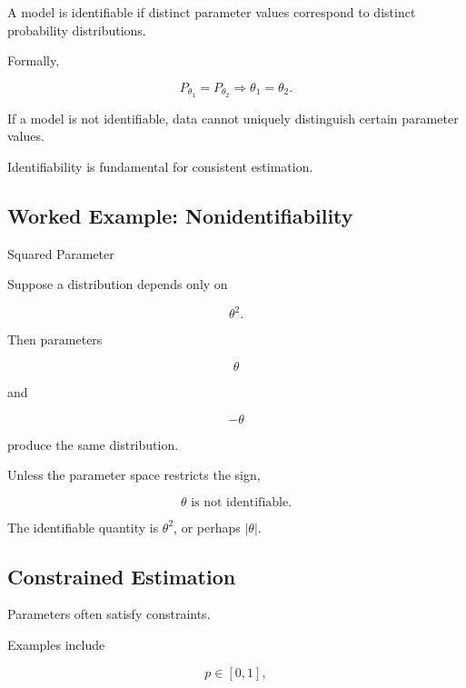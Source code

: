A model is identifiable if distinct parameter values correspond to
distinct probability distributions.

Formally,

\[
\boxed{
P_{\theta_1}
=
P_{\theta_2}
\Longrightarrow
\theta_1=\theta_2.
}
\]

If a model is not identifiable, data cannot uniquely distinguish certain
parameter values.

Identifiability is fundamental for consistent estimation.

\subsection{Worked Example: Nonidentifiability}
\label{subsec:worked-nonidentifiability}

\begin{workedexamplebox}{Squared Parameter}

Suppose a distribution depends only on

\[
\theta^2.
\]

Then parameters

\[
\theta
\]

and

\[
-\theta
\]

produce the same distribution.

Unless the parameter space restricts the sign,

\begin{answerbox}
\[
\boxed{
\theta
\text{ is not identifiable}.
}
\]
\end{answerbox}

The identifiable quantity is \(\theta^2\), or perhaps \(|\theta|\).

\end{workedexamplebox}

\subsection{Constrained Estimation}
\label{subsec:constrained-estimation}

Parameters often satisfy constraints.

Examples include

\[
\boxed{
p\in[0,1],
}
\]

